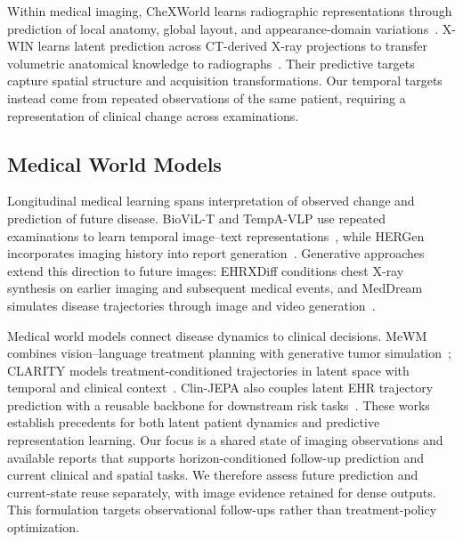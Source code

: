 Within medical imaging, CheXWorld learns radiographic representations through prediction of local anatomy, global layout, and appearance-domain variations~\citep{yue2025chexworld}. X-WIN learns latent prediction across CT-derived X-ray projections to transfer volumetric anatomical knowledge to radiographs~\citep{yang2026xwin}. Their predictive targets capture spatial structure and acquisition transformations. Our temporal targets instead come from repeated observations of the same patient, requiring a representation of clinical change across examinations.

\subsection{Medical World Models}
Longitudinal medical learning spans interpretation of observed change and prediction of future disease. BioViL-T and TempA-VLP use repeated examinations to learn temporal image--text representations~\citep{bannur2023biovilt,yang2025tempavlp}, while HERGen incorporates imaging history into report generation~\citep{wang2024hergen}. Generative approaches extend this direction to future images: EHRXDiff conditions chest X-ray synthesis on earlier imaging and subsequent medical events, and MedDream simulates disease trajectories through image and video generation~\citep{kyung2025ehrxdiff,cao2026meddream}.

Medical world models connect disease dynamics to clinical decisions. MeWM combines vision--language treatment planning with generative tumor simulation~\citep{yang2025medicalworldmodel}; CLARITY models treatment-conditioned trajectories in latent space with temporal and clinical context~\citep{ding2025clarity}. Clin-JEPA also couples latent EHR trajectory prediction with a reusable backbone for downstream risk tasks~\citep{yang2026clinjepa}. These works establish precedents for both latent patient dynamics and predictive representation learning. Our focus is a shared state of imaging observations and available reports that supports horizon-conditioned follow-up prediction and current clinical and spatial tasks. We therefore assess future prediction and current-state reuse separately, with image evidence retained for dense outputs. This formulation targets observational follow-ups rather than treatment-policy optimization.
